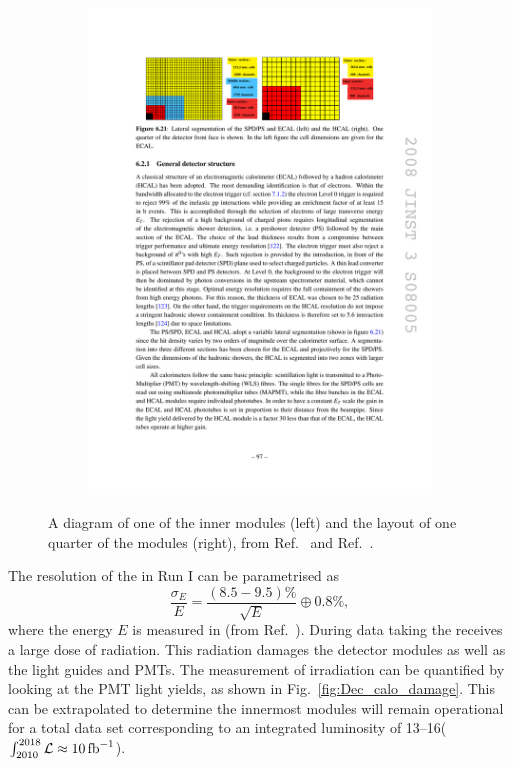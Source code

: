 \begin{figure}[!h]
\begin{subfigure}[m]{0.4\textwidth}
        \includegraphics[width=1.0\textwidth]{figs/Detector/ecal_layout.pdf}
    \end{subfigure}
    \caption{A diagram of one of the inner \ecal modules (left) and the layout of one quarter of the \ecal modules (right), from Ref.~\cite{Alves:2008zz} and Ref.~\cite{doi:1765047}.}
    \label{fig:Dec_ecal_layout}   
\end{figure}

The resolution of the \ecal in Run I can be parametrised as 
\begin{equation}
\frac{\sigma_{E}}{E} = \frac{(8.5-9.5)\%}{\sqrt{E}} \oplus 0.8\%,
\end{equation}
where the energy $E$ is measured in \gev (from Ref.~\cite{1748-0221-12-07-C07024}). During data taking the \ecal receives a large dose of radiation. This radiation damages the detector modules as well as the light guides and PMTs. The measurement of irradiation can be quantified by looking at the PMT light yields, as shown in Fig.~\ref{fig:Dec_calo_damage}. This can be extrapolated to determine the innermost \ecal modules will remain operational for a total data set corresponding to an integrated luminosity of 13--16\invfb ($\int_{2010}^{2018}\mathcal{L} \approx 10 \mbox{\,fb}^{-1} $).   


